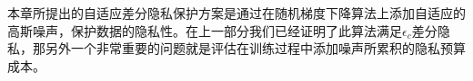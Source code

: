 

本章所提出的自适应差分隐私保护方案是通过在随机梯度下降算法上添加自适应的高斯噪声，保护数据的隐私性。在上一部分我们已经证明了此算法满足$\epsilon_{c}$差分隐私，那另外一个非常重要的问题就是评估在训练过程中添加噪声所累积的隐私预算成本。

